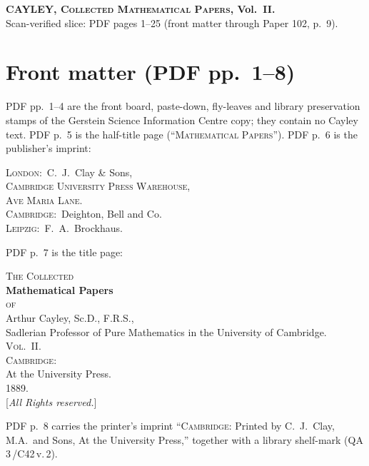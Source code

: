 \documentclass[11pt]{article}
\begin{document}

\begin{center}
{\large\bfseries CAYLEY, \textsc{Collected Mathematical Papers}, Vol.\ II.}\\[0.3em]
{\small Scan-verified slice: PDF pages 1--25 (front matter through Paper 102, p.\ 9).}
\end{center}
\bigskip

\section*{Front matter (PDF pp.\ 1--8)}
\noindent
PDF pp.\ 1--4 are the front board, paste-down, fly-leaves and library preservation stamps of the Gerstein Science Information Centre copy; they contain no Cayley text. PDF p.\ 5 is the half-title page (``\textsc{Mathematical Papers}''). PDF p.\ 6 is the publisher's imprint:
\begin{center}
\textsc{London:}\ C.\ J.\ Clay \& Sons,\\
\textsc{Cambridge University Press Warehouse,}\\
\textsc{Ave Maria Lane.}\\[0.3em]
\textsc{Cambridge:}\ Deighton, Bell and Co.\\
\textsc{Leipzig:}\ F.\ A.\ Brockhaus.
\end{center}
PDF p.\ 7 is the title page:
\begin{center}
\textsc{The Collected}\\[0.4em]
{\Large\bfseries Mathematical Papers}\\[0.4em]
\textsc{of}\\[0.4em]
{\large Arthur Cayley, Sc.D., F.R.S.,}\\
{\footnotesize Sadlerian Professor of Pure Mathematics in the University of Cambridge.}\\[0.4em]
\textsc{Vol.\ II.}\\[0.4em]
\textsc{Cambridge:}\\
At the University Press.\\
1889.\\[0.3em]
{\small [\emph{All Rights reserved.}]}
\end{center}
PDF p.\ 8 carries the printer's imprint ``\textsc{Cambridge:} Printed by C.\ J.\ Clay, M.A.\ and Sons, At the University Press,'' together with a library shelf-mark (QA\,3\,/C42\,v.\,2).
\clearpage
\end{document}
